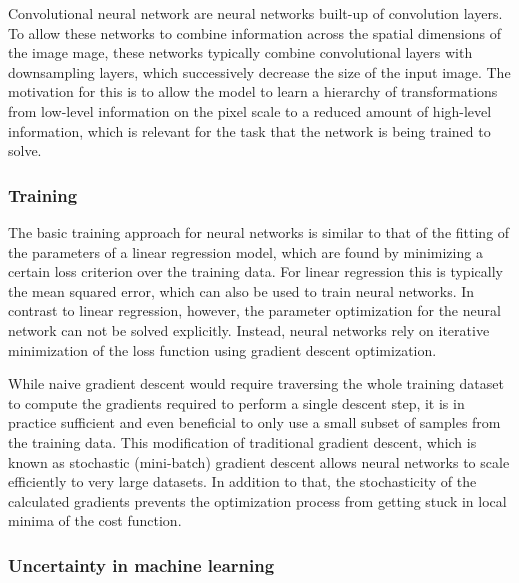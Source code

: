 Convolutional neural network are neural networks built-up of convolution layers.
To allow these networks to combine information across the spatial dimensions of
the image mage, these networks typically combine convolutional layers with
downsampling layers, which successively decrease the size of the input image.
The motivation for this is to allow the model to learn a hierarchy of
transformations from low-level information on the pixel scale to a reduced
amount of high-level information, which is relevant for the task that the
network is being trained to solve.

\subsubsection{Training}

The basic training approach for neural networks is similar to that of the
fitting of the parameters of a linear regression model, which are found by
minimizing a certain loss criterion over the training data. For linear
regression this is typically the mean squared error, which can also be used to
train neural networks. In contrast to linear regression, however, the parameter
optimization for the neural network can not be solved explicitly. Instead,
neural networks rely on iterative minimization of the loss function using
gradient descent optimization.

While naive gradient descent would require traversing the whole training dataset
to compute the gradients required to perform a single descent step, it is in
practice sufficient and even beneficial to only use a small subset of samples
from the training data. This modification of traditional gradient descent, which
is known as stochastic (mini-batch) gradient descent allows neural networks to
scale efficiently to very large datasets. In addition to that, the stochasticity
of the calculated gradients prevents the optimization process from getting stuck
in local minima of the cost function.

\subsubsection{Uncertainty in machine learning}

